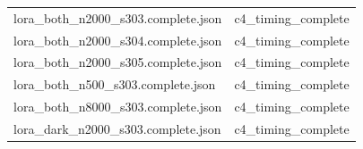 \begin{longtable}{>{\raggedright\arraybackslash}p{.49\linewidth}>{\raggedright\arraybackslash}p{.44\linewidth}}
lora\_\allowbreak{}both\_\allowbreak{}n2000\_\allowbreak{}s303.complete.json & %
c4\_\allowbreak{}timing\_\allowbreak{}complete \\ %

lora\_\allowbreak{}both\_\allowbreak{}n2000\_\allowbreak{}s304.complete.json & %
c4\_\allowbreak{}timing\_\allowbreak{}complete \\ %

lora\_\allowbreak{}both\_\allowbreak{}n2000\_\allowbreak{}s305.complete.json & %
c4\_\allowbreak{}timing\_\allowbreak{}complete \\ %

lora\_\allowbreak{}both\_\allowbreak{}n500\_\allowbreak{}s303.complete.json & %
c4\_\allowbreak{}timing\_\allowbreak{}complete \\ %

lora\_\allowbreak{}both\_\allowbreak{}n8000\_\allowbreak{}s303.complete.json & %
c4\_\allowbreak{}timing\_\allowbreak{}complete \\ %

lora\_\allowbreak{}dark\_\allowbreak{}n2000\_\allowbreak{}s303.complete.json & %
c4\_\allowbreak{}timing\_\allowbreak{}complete \\ %


\end{longtable}
